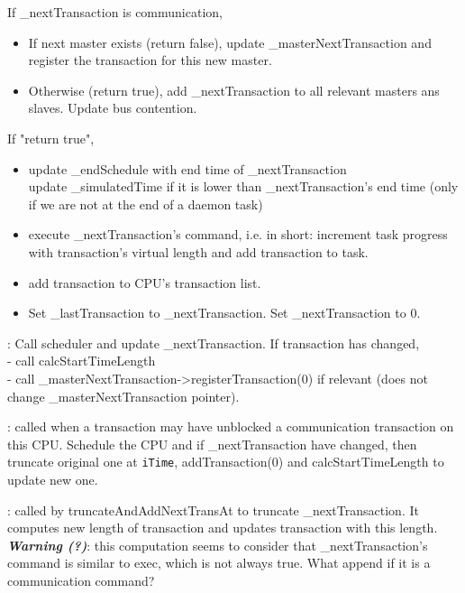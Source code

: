 \documentclass[a4paper,11pt]{article}
\newcommand{\bfont}{\fontseries{b}\selectfont}
\newcommand{\cod}[1]{{\ttfamily #1}}
\newcommand{\method}[1]{\par\vspace{1mm}\hspace{-2mm}\colorbox{method}{\textopenbullet\bfont\cod{#1}:}}
\begin{document}
If \cod{\_nextTransaction} is communication,
	\begin{itemize}
	  \item If next master exists (return false), update \cod{\_masterNextTransaction} and register the transaction for this new master.
	  \item Otherwise (return true), add \cod{\_nextTransaction} to all relevant masters ans slaves. Update bus contention.
	\end{itemize}
If "return true",
	\begin{itemize}
	  \item update \cod{\_endSchedule} with end time of \cod{\_nextTransaction}\\
	  update \cod{\_simulatedTime} if it is lower than \cod{\_nextTransaction}'s end time (only if we are not at the end of a daemon task)
	  \item execute \cod{\_nextTransaction}'s command, i.e. in short: increment task progress with transaction's virtual length and add transaction to task.
	  \item add transaction to CPU's transaction list.
	  \item Set \cod{\_lastTransaction} to \cod{\_nextTransaction}. Set \cod{\_nextTransaction} to 0.
	\end{itemize}
\method{schedule(iEndSchedule)} Call scheduler and update \cod{\_nextTransaction}. If transaction has changed,\\
- call \cod{calcStartTimeLength}\\
- call \cod{\_masterNextTransaction->registerTransaction(0)} if relevant (does not change \cod{\_masterNextTransaction} pointer).

\method{truncateAndAddNextTransAt(iTime)} called when a transaction may have unblocked a communication transaction on this CPU. Schedule the CPU and if \cod{\_next\-Transaction} have changed, then truncate original one at {\tt iTime}, \cod{addTransaction(0)} and \cod{calcStart\-TimeLength} to update new one.

\method{truncateNextTransAt(iTime)} called by \cod{truncateAndAddNextTransAt} to truncate \cod{\_next\-Transaction}. It computes new length of transaction and updates transaction with this length.\\ {\bfseries\textit{Warning (?)}}: this computation seems to consider that \cod{\_nextTransaction}'s command is similar to exec, which is not always true. What append if it is a communication command?
\end{document}
